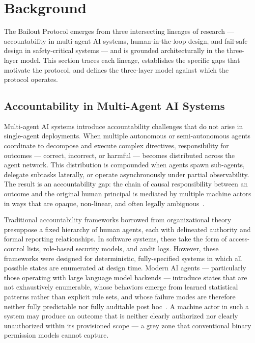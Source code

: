 \section{Background}
\label{sec:background}

The Bailout Protocol emerges from three intersecting lineages of research — accountability in multi-agent AI systems, human-in-the-loop design, and fail-safe design in safety-critical systems — and is grounded architecturally in the \bxthree{} three-layer model. This section traces each lineage, establishes the specific gaps that motivate the protocol, and defines the three-layer model against which the protocol operates.

\subsection{Accountability in Multi-Agent AI Systems}
\label{sec:accountability}

Multi-agent AI systems introduce accountability challenges that do not arise in single-agent deployments. When multiple autonomous or semi-autonomous agents coordinate to decompose and execute complex directives, responsibility for outcomes — correct, incorrect, or harmful — becomes distributed across the agent network. This distribution is compounded when agents spawn sub-agents, delegate subtasks laterally, or operate asynchronously under partial observability. The result is an accountability gap: the chain of causal responsibility between an outcome and the original human principal is mediated by multiple machine actors in ways that are opaque, non-linear, and often legally ambiguous~\cite{bansal2019}.

Traditional accountability frameworks borrowed from organizational theory presuppose a fixed hierarchy of human agents, each with delineated authority and formal reporting relationships. In software systems, these take the form of access-control lists, role-based security models, and audit logs. However, these frameworks were designed for deterministic, fully-specified systems in which all possible states are enumerated at design time. Modern AI agents — particularly those operating with large language model backends — introduce states that are not exhaustively enumerable, whose behaviors emerge from learned statistical patterns rather than explicit rule sets, and whose failure modes are therefore neither fully predictable nor fully auditable post hoc~\cite{dijkstra1982}. A machine actor in such a system may produce an outcome that is neither clearly authorized nor clearly unauthorized within its provisioned scope — a grey zone that conventional binary permission models cannot capture.

